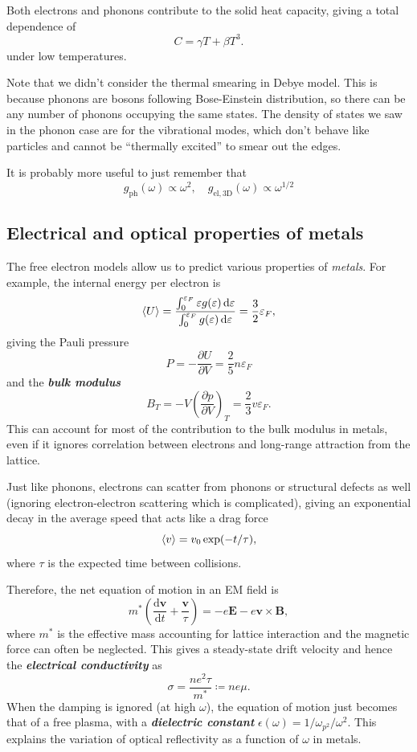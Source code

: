 \documentclass{article}
\theoremstyle{nonumberplain}
\begin{document}
Both electrons and phonons contribute to the solid heat capacity, giving a total dependence of 
\[
    C = \gamma T + \beta T^3. 
\]
under low temperatures. 

Note that we didn't consider the thermal smearing in Debye model. This is because phonons are bosons following Bose-Einstein distribution, so there can be any number of phonons occupying the same states. The density of states we saw in the phonon case are for the vibrational modes, which don't behave like particles and cannot be ``thermally excited'' to smear out the edges. 

It is probably more useful to just remember that 
\[
    \boxed{g_{\mathrm{ph} }(\omega) \propto \omega ^{2}, \quad 
    g_{\mathrm{el, 3D} }(\omega ) \propto \omega ^{1 / 2}}
\]

\subsection{Electrical and optical properties of metals}
The free electron models allow us to predict various properties of \textit{metals}. For example, the internal energy per electron is
\[
    \expval{U} = \frac{\int_{0}^{\varepsilon_F} \varepsilon g(\varepsilon ) \,\mathrm{d}\varepsilon  }{\int_{0}^{\varepsilon_F} g(\varepsilon ) \,\mathrm{d}\varepsilon  } = \frac{3}{2}\varepsilon_F,
\]
giving the Pauli pressure 
\[
    P = -\frac{\partial U}{\partial V} = \frac{2}{5}n \varepsilon_F
\]
and the \textit{\textbf{bulk modulus}}
\[
    B_T = -V \left( \frac{\partial p}{\partial V} \right)_{T} = \frac{2}{3}v \varepsilon_F. 
\]
This can account for most of the contribution to the bulk modulus in metals, even if it ignores correlation between electrons and long-range attraction from the lattice. 

Just like phonons, electrons can scatter from phonons or structural defects as well (ignoring electron-electron scattering which is complicated), giving an exponential decay in the average speed that acts like a drag force
\[
    \expval{v} = v_0 \exp(- t / \tau), 
\]
where $\tau$ is the expected time between collisions. 

Therefore, the net equation of motion in an EM field is 
\[
    \boxed{m^{*} \left(\frac{\mathrm{d}\mathbf{v} }{\mathrm{d}t} + \frac{\mathbf{v} }{\tau } \right) = - e \mathbf{E} - e \mathbf{v} \times \mathbf{B},} 
\]
where $m^{*}$ is the effective mass accounting for lattice interaction and the magnetic force can often be neglected. This gives a steady-state drift velocity and hence the \textit{\textbf{electrical conductivity}} as 
\[
    \sigma  = \frac{n e^{2} \tau }{m^*} \coloneqq n e \mu. 
\]
When the damping is ignored (at high $\omega$), the equation of motion just becomes that of a free plasma, with a \textit{\textbf{dielectric constant}} $\epsilon(\omega ) = 1 / \omega_{p^{2} } / \omega ^{2}. $ This explains the variation of optical reflectivity as a function of $\omega$ in metals. 
\end{document}
